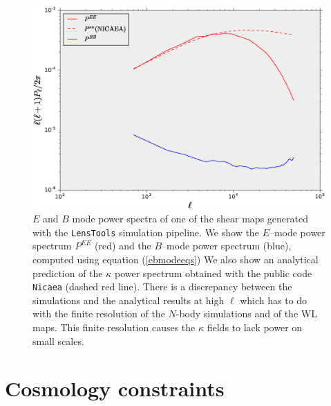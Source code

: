 \documentclass[5p]{elsarticle}
\newcommand{\ttt}[1]{\texttt{#1}}
\newcommand{\LT}{\texttt{LensTools} }
\begin{document}
\begin{figure}
\includegraphics[scale=0.3]{Figures/eb_modes.eps}
\caption{$E$ and $B$ mode power spectra of one of the shear maps generated with the \LT simulation pipeline. We show the $E$--mode power spectrum $P^{EE}$ (red) and the $B$--mode power spectrum (blue), computed using equation (\ref{ebmodeeqs}) We also show an analytical prediction of the $\kappa$ power spectrum obtained with the public code \ttt{Nicaea} (dashed red line). There is a discrepancy between the simulations and the analytical results at high $\ell$ which has to do with the finite resolution of the $N$-body simulations and of the WL maps. This finite resolution causes the $\kappa$ fields to lack power on small scales.}
\label{ebmodefig}
\end{figure}



\section{Cosmology constraints}
\end{document}
